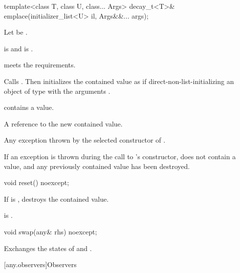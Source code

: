%
\begin{itemdecl}
template<class T, class U, class... Args>
  decay_t<T>& emplace(initializer_list<U> il, Args&&... args);
\end{itemdecl}

\begin{itemdescr}
\pnum
Let  be .

\pnum
\constraints
{} is  and
 is .

\pnum
\expects
{} meets the  requirements.

\pnum
\effects
Calls . Then initializes the contained value
as if direct-non-list-initializing an object of type  with the arguments
.

\pnum
\ensures
{} contains a value.

\pnum
\returns
A reference to the new contained value.

\pnum
\throws
Any exception thrown by the selected constructor of .

\pnum
\remarks
If an exception is thrown during the call to 's constructor,
 does not contain a value, and any previously contained value
has been destroyed.
\end{itemdescr}

%
\begin{itemdecl}
void reset() noexcept;
\end{itemdecl}

\begin{itemdescr}
\pnum
\effects
If  is , destroys the contained value.

\pnum
\ensures
{} is .
\end{itemdescr}

%
\begin{itemdecl}
void swap(any& rhs) noexcept;
\end{itemdecl}

\begin{itemdescr}

\pnum
\effects
Exchanges the states of  and .
\end{itemdescr}

[any.observers]{Observers}


